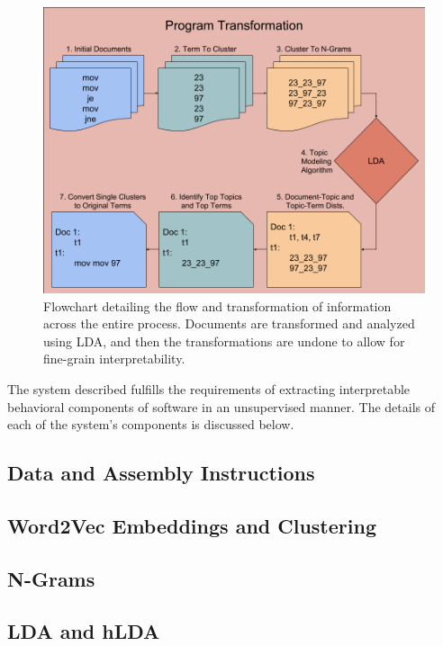 \begin{figure}
  \includegraphics[width=\linewidth]{./figures/transform.png}
  \caption{Flowchart detailing the flow and transformation of information across the entire process. Documents are transformed and analyzed using LDA, and then the transformations are undone to allow for fine-grain interpretability.}
  \label{fig:flow}
\end{figure}

The system described fulfills the requirements of extracting interpretable behavioral components of software in an unsupervised manner. The details of each of the system's components is discussed below.

\subsection{Data and Assembly Instructions}
	
	
\subsection{Word2Vec Embeddings and Clustering}
	
	
\subsection{N-Grams}
	
	
\subsection{LDA and hLDA}
	
	
